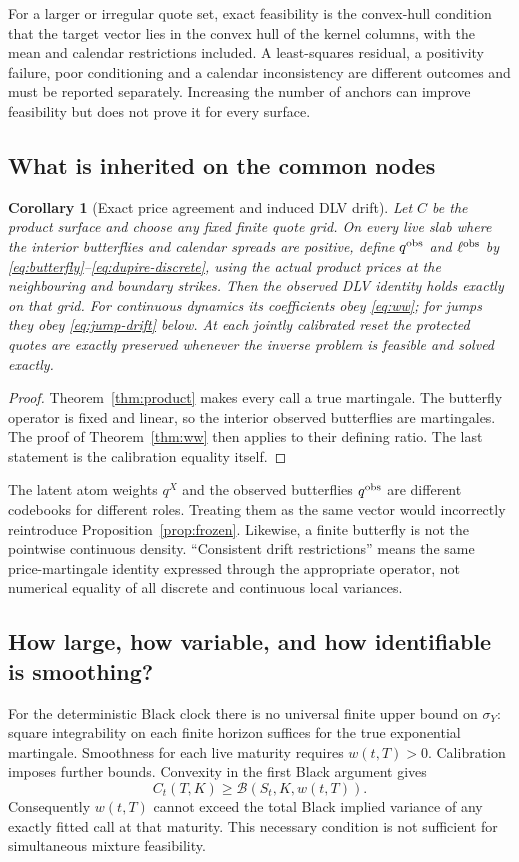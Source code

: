 \documentclass[11pt,a4paper]{article}
\numberwithin{equation}{section}
\newtheorem{corollary}[theorem]{Corollary}
\theoremstyle{definition}\newtheorem{definition}[theorem]{Definition}
\theoremstyle{remark}\newtheorem{remark}[theorem]{Remark}
\newcommand{\Black}{\mathcal B}\newcommand{\LC}{\mathcal L}
\begin{document}
For a larger or irregular quote set, exact feasibility is the convex-hull condition that the target vector lies in the convex hull of the kernel columns, with the mean and calendar restrictions included. A least-squares residual, a positivity failure, poor conditioning and a calendar inconsistency are different outcomes and must be reported separately. Increasing the number of anchors can improve feasibility but does not prove it for every surface.

\subsection{What is inherited on the common nodes}
\begin{corollary}[Exact price agreement and induced DLV drift]
\label{cor:node}
Let $C$ be the product surface and choose any fixed finite quote grid. On every live slab where the interior butterflies and calendar spreads are positive, define $q^{\rm obs}$ and $\ell^{\rm obs}$ by \eqref{eq:butterfly}--\eqref{eq:dupire-discrete}, using the actual product prices at the neighbouring and boundary strikes. Then the observed DLV identity holds exactly on that grid. For continuous dynamics its coefficients obey \eqref{eq:ww}; for jumps they obey \eqref{eq:jump-drift} below. At each jointly calibrated reset the protected quotes are exactly preserved whenever the inverse problem is feasible and solved exactly.
\end{corollary}
\begin{proof}
Theorem~\ref{thm:product} makes every call a true martingale. The butterfly operator is fixed and linear, so the interior observed butterflies are martingales. The proof of Theorem~\ref{thm:ww} then applies to their defining ratio. The last statement is the calibration equality itself.
\end{proof}
The latent atom weights $q^X$ and the observed butterflies $q^{\rm obs}$ are different codebooks for different roles. Treating them as the same vector would incorrectly reintroduce Proposition~\ref{prop:frozen}. Likewise, a finite butterfly is not the pointwise continuous density. ``Consistent drift restrictions'' means the same price-martingale identity expressed through the appropriate operator, not numerical equality of all discrete and continuous local variances.

\subsection{How large, how variable, and how identifiable is smoothing?}
For the deterministic Black clock there is no universal finite upper bound on $\sigma_Y$: square integrability on each finite horizon suffices for the true exponential martingale. Smoothness for each live maturity requires $w(t,T)>0$. Calibration imposes further bounds. Convexity in the first Black argument gives
\begin{equation}
 C_t(T,K)\geq\Black(S_t,K,w(t,T)).
 \label{eq:black-floor}
\end{equation}
Consequently $w(t,T)$ cannot exceed the total Black implied variance of any exactly fitted call at that maturity. This necessary condition is not sufficient for simultaneous mixture feasibility.
\end{document}
